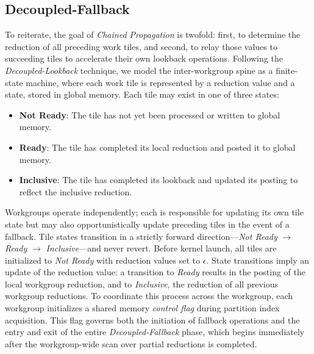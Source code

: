 \documentclass[sigconf]{acmart}
\begin{document}
\subsection{Decoupled-Fallback}
To reiterate, the goal of \emph{Chained Propagation} is twofold: first, to determine the reduction of all preceding work tiles, and second, to relay those values to succeeding tiles to accelerate their own lookback operations. Following the \emph{Decoupled-Lookback} technique, we model the inter-workgroup spine as a finite-state machine, where each work tile is represented by a reduction value and a state, stored in global memory. Each tile may exist in one of three states:
\begin{itemize}
  \item \textbf{Not Ready}: The tile has not yet been processed or written to global memory.
  \item \textbf{Ready}: The tile has completed its local reduction and posted it to global memory.
  \item \textbf{Inclusive}: The tile has completed its lookback and updated its posting to reflect the inclusive reduction.
\end{itemize}
Workgroups operate independently; each is responsible for updating its own tile state but may also opportunistically update preceding tiles in the event of a fallback. Tile states transition in a strictly forward direction---\emph{Not Ready} $\rightarrow$ \emph{Ready} $\rightarrow$ \emph{Inclusive}---and never revert. Before kernel launch, all tiles are initialized to \emph{Not Ready} with reduction values set to $\epsilon$. State transitions imply an update of the reduction value: a transition to \emph{Ready} results in the posting of the local workgroup reduction, and to \emph{Inclusive}, the reduction of all previous workgroup reductions. To coordinate this process across the workgroup, each workgroup initializes a shared memory \emph{control flag} during partition index acquisition. This flag governs both the initiation of fallback operations and the entry and exit of the entire \emph{Decoupled-Fallback} phase, which begins immediately after the workgroup-wide scan over partial reductions is completed.
\end{document}
